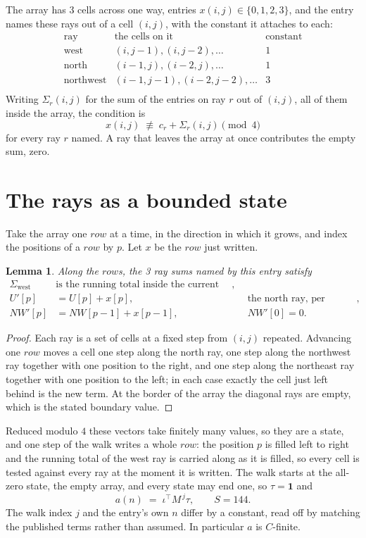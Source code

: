 \documentclass[11pt,a4paper]{article}
\theoremstyle{plain}
\newtheorem{lemma}[theorem]{Lemma}
\theoremstyle{definition}
\begin{document}
The array has $3$ cells across one way, entries $x(i,j)\in\{0,1,2,3\}$, and the entry names these
rays out of a cell $(i,j)$, with the constant it attaches to each:
\[
\begin{array}{lll}
\text{ray} & \text{the cells on it} & \text{constant} \\[2pt]
\text{west} & (i,j-1),(i,j-2),\dots & 1 \\
\text{north} & (i-1,j),(i-2,j),\dots & 1 \\
\text{northwest} & (i-1,j-1),(i-2,j-2),\dots & 3 \\
\end{array}
\]
Writing $\Sigma_r(i,j)$ for the sum of the entries on ray $r$ out of $(i,j)$, all of them
inside the array, the condition is
\[
x(i,j)\;\not\equiv\;c_r+\Sigma_r(i,j) \pmod{4}
\]
for every ray $r$ named. A ray that leaves the array at once contributes the empty sum,
zero.

\section{The rays as a bounded state}

Take the array one $row$ at a time, in the direction in which it grows, and index the
positions of a $row $ by $p$. Let $x$ be the $row$ just written.

\begin{lemma}\label{lem:rays}
Along the $row$s, the 3 ray sums named by this entry satisfy
\[
\begin{aligned}
\Sigma_{\mathrm{west}}\ &\text{is the running total inside the current row},\\
U'[p]&=U[p]+x[p], &&\text{the north ray, per position},\\
NW'[p]&=NW[p-1]+x[p-1], && NW'[0]=0 .
\end{aligned}
\]
\end{lemma}

\begin{proof}
Each ray is a set of cells at a fixed step from $(i,j)$ repeated. Advancing one $row$
moves a cell one step along the north ray, one step along the northwest ray together with one
position to the right, and one step along the northeast ray together with one position to the
left; in each case exactly the cell just left behind is the new term. At the border of the
array the diagonal rays are empty, which is the stated boundary value.
\end{proof}

Reduced modulo $4$ these vectors take finitely many values, so they are a state, and one step
of the walk writes a whole $row$: the position $p$ is filled left to right and the
running total of the west ray is carried along as it is filled, so every cell is tested
against every ray at the moment it is written. The walk starts at the all-zero state, the empty
array, and every state may end one, so $\tau=\mathbf{1}$ and
\[
a(n)\;=\;\iota^{\!\top}M^{\,j}\tau ,\qquad S=144.
\]
The walk index $j$ and the entry's own $n$ differ by a constant, read off by matching the
published terms rather than assumed. In particular $a$ is $C$-finite.
\end{document}
